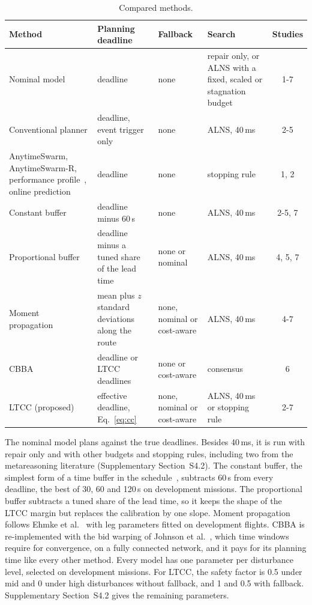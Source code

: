 \documentclass[a4paper,fleqn]{cas-dc}
\newcommand{\mname}{LTCC}  %
\newcounter{prop}
\begin{document}
\begin{table}[t]
\caption{Compared methods.}\label{tab:methods}
\centering\footnotesize
\setlength{\tabcolsep}{4pt}
\begin{tabular}{@{}>{\raggedright\arraybackslash}p{3.8cm}>{\raggedright\arraybackslash}p{4.6cm}%
>{\raggedright\arraybackslash}p{2.8cm}>{\raggedright\arraybackslash}p{4.1cm}c@{}}
\toprule
Method & Planning deadline & Fallback & Search & Studies \\
\midrule
Nominal model~\cite{ropke2006adaptive} & deadline & none & repair only, or ALNS with a fixed, scaled or stagnation budget & 1-7 \\
Conventional planner & deadline, event trigger only & none & ALNS, 40\,ms & 2-5 \\
AnytimeSwarm, AnytimeSwarm-R, performance profile~\cite{boddy1994deliberation,zilberstein1996using}, online prediction~\cite{svegliato2018meta} & deadline & none & stopping rule & 1, 2 \\
Constant buffer~\cite{jabali2015selfimposed} & deadline minus 60\,s & none & ALNS, 40\,ms & 2-5, 7 \\
Proportional buffer & deadline minus a tuned share of the lead time & none or nominal & ALNS, 40\,ms & 4, 5, 7 \\
Moment propagation~\cite{ehmke2015ensuring} & mean plus $z$ standard deviations along the route & none, nominal or cost-aware & ALNS, 40\,ms & 4-7 \\
CBBA~\cite{choi2009consensus,johnson2012nonsubmodular} & deadline or \mname{} deadlines & none or cost-aware & consensus & 6 \\
\mname{} (proposed) & effective deadline, Eq.~\eqref{eq:cc} & none, nominal or cost-aware & ALNS, 40\,ms or stopping rule & 2-7 \\
\bottomrule
\end{tabular}
\end{table}

The nominal model plans against the true deadlines. Besides 40\,ms, it is run with repair only and with other budgets
and stopping rules, including two from the metareasoning literature (Supplementary Section~S4.2). The
constant buffer, the simplest form of a time buffer in the
schedule~\cite{jabali2015selfimposed}, subtracts 60\,s from every deadline, the best of 30, 60 and 120\,s on
development missions. The proportional buffer subtracts a tuned share of the
lead time, so it keeps the shape of the \mname{} margin but replaces the calibration by one slope. Moment propagation
follows Ehmke et al.~\cite{ehmke2015ensuring} with leg parameters fitted on development flights. CBBA is
re-implemented with the bid warping of Johnson et al.~\cite{johnson2012nonsubmodular}, which time windows require for
convergence, on a fully connected network, and it pays for its planning time like every other method. Every model has
one parameter per disturbance level, selected on development missions. For \mname{}, the safety factor is 0.5 under
mid and 0 under high disturbances without fallback, and 1 and 0.5 with fallback. Supplementary
Section~S4.2 gives the remaining parameters.
\end{document}
